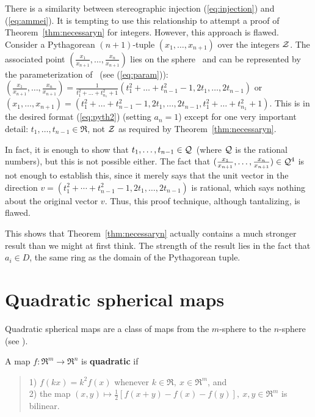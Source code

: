 There is a similarity between stereographic injection (\ref{eq:injection})
and (\ref{eq:ammei}). %
It is tempting to use this relationship to 
attempt a proof of Theorem~\ref{thm:necessaryn} for integers.
However, this approach is flawed.
Consider a Pythagorean $(n+1)$-tuple $(x_1,\ldots,x_{n+1})$ over the
integers ${\cal Z}$.
The associated point 
$(\frac{x_1}{x_{n+1}},\ldots,\frac{x_n}{x_{n+1}})$ lies on the sphere \ 
and can be represented by the parameterization of \ 
(see (\ref{eq:param})):
$(\frac{x_1}{x_{n+1}},\ldots,\frac{x_n}{x_{n+1}}) = 
\frac{1}{t_1^2 + \ldots + t_{n_1}^2 + 1} 
	(t_1^2 + \ldots + t_{n-1}^2 - 1, 2t_1, \ldots, 2t_{n-1})$
or $(x_1,\ldots,x_{n+1}) = 
(t_1^2 + \ldots + t_{n-1}^2 - 1, 2t_1, \ldots, 2t_{n-1}, 
t_1^2 + \ldots + t_{n_1}^2 + 1)$.
This is in the desired format (\ref{eq:pyth2}) (setting $a_n=1$) except
for one very important detail:
$t_1,\ldots,t_{n-1} \in \Re$, not ${\cal Z}$ as required by 
Theorem~\ref{thm:necessaryn}.

In fact, it is enough to show that $t_1,\ldots,t_{n-1} \in {\cal Q}$\
(where ${\cal Q}$ is the rational numbers),
but this is not possible either.
The fact that 
$(\frac{x_1}{x_{n+1}},\ldots,\frac{x_n}{x_{n+1}}) \in {\cal Q}^4$
is not enough to establish this,
since it merely says that the unit vector in the direction 
$v = (t_1^2 + \cdots + t_{n-1}^2 - 1, 2t_1, \ldots, 2t_{n-1})$ is rational,
which says nothing about the original vector $v$.
Thus, this proof technique, although tantalizing, is flawed.

This shows that Theorem~\ref{thm:necessaryn} actually contains a much 
stronger result than we might at first think.
The strength of the result lies in the fact that $a_i \in D$,
the same ring as the domain of the Pythagorean tuple.

\section{Quadratic spherical maps}

Quadratic spherical maps are a class of maps from the $m$-sphere to the
$n$-sphere %
(see \cite{ono94}).	%

\begin{defn2}
A map $f:\Re^m \rightarrow \Re^n$ is {\bf quadratic} if 
\begin{quote}
1) $f(kx) = k^2 f(x)$ whenever $k \in \Re,\ x \in \Re^m$, and \\
2) the map $(x,y) \mapsto \frac{1}{2} [f(x+y) - f(x) - f(y)],\ x,y\in\Re^m$
is bilinear.
\end{quote}
\end{defn2}

